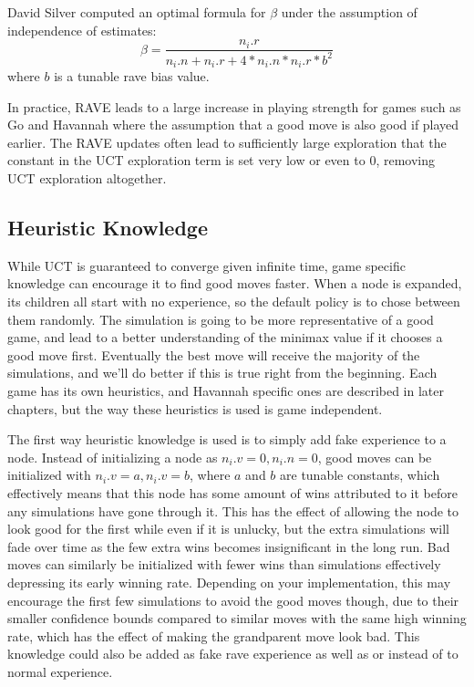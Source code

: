David Silver computed an optimal formula for $\beta$ under the assumption of independence of estimates:
\begin{equation}\label{eqn:rave4} \beta = \frac{n_i.r}{n_i.n+n_i.r+4*n_i.n*n_i.r*b^2} \end{equation}
where $b$ is a tunable rave bias value.

In practice, RAVE leads to a large increase in playing strength for games such as Go and Havannah where the assumption that a good move is also good if played earlier. The RAVE updates often lead to sufficiently large exploration that the constant in the UCT exploration term is set very low or even to 0, removing UCT exploration altogether.

\subsection{Heuristic Knowledge}\label{sec:heuristicknowledge}

While UCT is guaranteed to converge given infinite time, game specific knowledge can encourage it to find good moves faster. When a node is expanded, its children all start with no experience, so the default policy is to chose between them randomly. The simulation is going to be more representative of a good game, and lead to a better understanding of the minimax value if it chooses a good move first. Eventually the best move will receive the majority of the simulations, and we'll do better if this is true right from the beginning. Each game has its own heuristics, and Havannah specific ones are described in later chapters, but the way these heuristics is used is game independent.

The first way heuristic knowledge is used is to simply add fake experience to a node. Instead of initializing a node as $n_i.v = 0, n_i.n = 0$, good moves can be initialized with $n_i.v = a, n_i.v = b$, where $a$ and $b$ are tunable constants, which effectively means that this node has some amount of wins attributed to it before any simulations have gone through it. This has the effect of allowing the node to look good for the first while even if it is unlucky, but the extra simulations will fade over time as the few extra wins becomes insignificant in the long run. Bad moves can similarly be initialized with fewer wins than simulations effectively depressing its early winning rate. Depending on your implementation, this may encourage the first few simulations to avoid the good moves though, due to their smaller confidence bounds compared to similar moves with the same high winning rate, which has the effect of making the grandparent move look bad. This knowledge could also be added as fake rave experience as well as or instead of to normal experience.

